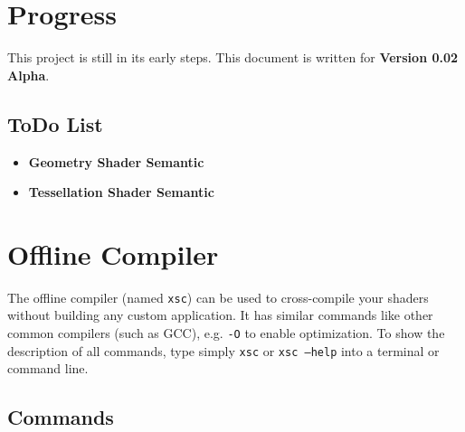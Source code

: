 \documentclass{article}
\begin{document}
\newpage
\section{Progress}

This project is still in its early steps. This document is written for \XSC \textbf{Version 0.02 Alpha}.

\subsection{ToDo List}
\begin{itemize}
	\item \textbf{Geometry Shader Semantic}
	\item \textbf{Tessellation Shader Semantic}
\end{itemize}



\newpage
\section{Offline Compiler}

The offline compiler (named \texttt{xsc}) can be used to cross-compile your shaders without building any custom application.
It has similar commands like other common compilers (such as GCC), e.g. \texttt{-O} to enable optimization.
To show the description of all commands, type simply \texttt{xsc} or \texttt{xsc --help} into a terminal or command line.

\subsection{Commands}
\end{document}

